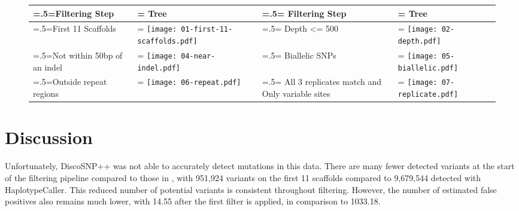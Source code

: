 
\begin{figure}
\centering
\begin{tabularx}{\textwidth}{ >{\hsize=.5\hsize\linewidth=\hsize}X >{\hsize=1.5\hsize\linewidth=\hsize}X | >{\hsize=.5\hsize\linewidth=\hsize}X >{\hsize=1.5\hsize\linewidth=\hsize}X }
\toprule
Filtering Step & Tree & Filtering Step & Tree \\
\midrule
First 11 Scaffolds & \texttt{[image: 01-first-11-scaffolds.pdf]} &
Depth <= 500 & \texttt{[image: 02-depth.pdf]} \\
Not within 50bp of an indel & \texttt{[image: 04-near-indel.pdf]} &
Biallelic SNPs & \texttt{[image: 05-biallelic.pdf]}\\
Outside repeat regions & \texttt{[image: 06-repeat.pdf]} &
All 3 replicates match and Only variable sites & \texttt{[image: 07-replicate.pdf]}\\
\bottomrule
\end{tabularx}
\label{fig:ev_filtertrees}
\end{figure}

\section{Discussion}

Unfortunately, DiscoSNP++ was not able to accurately detect mutations in this data. There are many fewer detected variants at the start of the filtering pipeline compared to those in \cite{orr_phylogenomic_2020}, with 951,924 variants on the first 11 scaffolds compared to 9,679,544 detected with HaplotypeCaller. This reduced number of potential variants is consistent throughout filtering. However, the number of estimated false positives also remains much lower, with 14.55 after the first filter is applied, in comparison to 1033.18.

